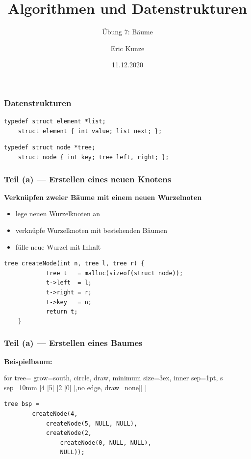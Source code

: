 \documentclass{beamer}
\begin{document}
	
	\title{Algorithmen und Datenstrukturen}
	\subtitle{Übung 7: Bäume}
	\author{Eric Kunze}
	\date{11.12.2020}

	\maketitle



\begin{frame}[fragile, t] \frametitle{Datenstrukturen}
	\begin{lstlisting}[style=notebook]
	typedef struct element *list;
	struct element { int value; list next; };
	\end{lstlisting}
	\pause
	\begin{lstlisting}[style=notebook]
	typedef struct node *tree;
	struct node { int key; tree left, right; };

	\end{lstlisting}
\end{frame}

\begin{frame}[fragile] \frametitle{Teil (a) --- Erstellen eines neuen Knotens}
	\textbf{Verknüpfen zweier Bäume mit einem neuen Wurzelnoten}
	\pause
	\begin{itemize}
		\item lege neuen Wurzelknoten an
		\item verknüpfe Wurzelknoten mit bestehenden Bäumen
		\item fülle neue Wurzel mit Inhalt
	\end{itemize}
	\pause
	\begin{lstlisting}[style=notebook]
	tree createNode(int n, tree l, tree r) {
			tree t   = malloc(sizeof(struct node));
			t->left  = l;
			t->right = r;
			t->key   = n;
			return t;
	}
	\end{lstlisting}
\end{frame}

\begin{frame}[fragile] \frametitle{Teil (a) --- Erstellen eines Baumes}
	\textbf{Beispielbaum:}
	\begin{center}
		\begin{forest}
			for tree={ grow=south, circle, draw, minimum size=3ex, inner sep=1pt, s sep=10mm }
			[4 	[5] [2 [0] [,no edge, draw=none]] ]
		\end{forest}
	\end{center}
	\pause
	\begin{lstlisting}[style=notebook]
	tree bsp = 
		createNode(4,
			createNode(5, NULL, NULL),
			createNode(2,
				createNode(0, NULL, NULL),
				NULL));
	\end{lstlisting}
\end{frame}
\end{document}
